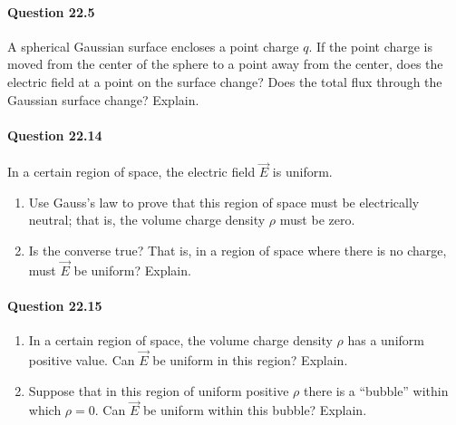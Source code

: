 \documentclass[11pt]{article}
\newenvironment{problem}
{
    \color{darkgray}
    \ignorespaces
}
\renewcommand{\vec}[1]{\mathbf{#1}}
\begin{document}
	

\newcommand{\vE}{\vec{E}}

\paragraph{Question 22.5}
\begin{problem}
	A spherical Gaussian surface encloses a point charge $q$.  If the point charge is moved from the center of the sphere to a point away from the center, does the electric field at a point on the surface change?  Does the total flux through the Gaussian surface change?  Explain.
\end{problem}

\vfill

\paragraph{Question 22.14}
\begin{problem}
	In a certain region of space, the electric field $\vE$ is uniform.
	\begin{enumerate}
		\item Use Gauss's law to prove that this region of space must be electrically neutral; that is, the volume charge density $\rho$ must be zero.
		\item Is the converse true?  That is, in a region of space where there is no charge, must $\vE$ be uniform?  Explain.
	\end{enumerate}
\end{problem}

\vfill

\paragraph{Question 22.15}
\begin{problem}
	\begin{enumerate}
		\item In a certain region of space, the volume charge density $\rho$ has a uniform positive value.  Can $\vE$ be uniform in this region?  Explain.
		\item Suppose that in this region of uniform positive $\rho$ there is a ``bubble'' within which $\rho = 0$.  Can $\vE$ be uniform within this bubble?  Explain.
	\end{enumerate}
\end{problem}

\vfill

\clearpage
\end{document}
